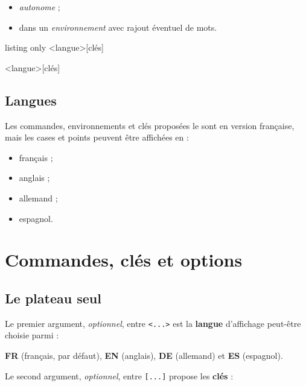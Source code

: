 \documentclass{article}
\newcommand\Cle[1]{{\bfseries\sffamily\textlangle #1\textrangle}}
\begin{document}
\begin{itemize}
	\item \textit{autonome} ;
	\item dans un \textit{environnement} avec rajout éventuel de mots.
\end{itemize}

\begin{PresentationCode}{listing only}
\PlateauScrabble<langue>[clés]

\begin{EnvScrabble}<langue>[clés]
\end{EnvScrabble}
\end{PresentationCode}

\subsection{Langues}

Les \textsf{commandes}, \textsf{environnements} et \textsf{clés} proposées le sont en version \textsf{française}, mais les cases et points peuvent être affichées en :

\begin{itemize}
	\item français ;
	\item anglais ;
	\item allemand ;
	\item espagnol.
\end{itemize}

\pagebreak

\section{Commandes, clés et options}

\subsection{Le plateau seul}

Le premier argument, \textit{optionnel}, entre \texttt{<...>} est la \Cle{langue} d'affichage peut-être choisie parmi :

\hfill\Cle{FR} (français, par défaut), \Cle{EN} (anglais), \Cle{DE} (allemand) et \Cle{ES} (espagnol).\hfill~

\smallskip

Le second argument, \textit{optionnel}, entre \texttt{[...]} propose les \Cle{clés} :
\end{document}
